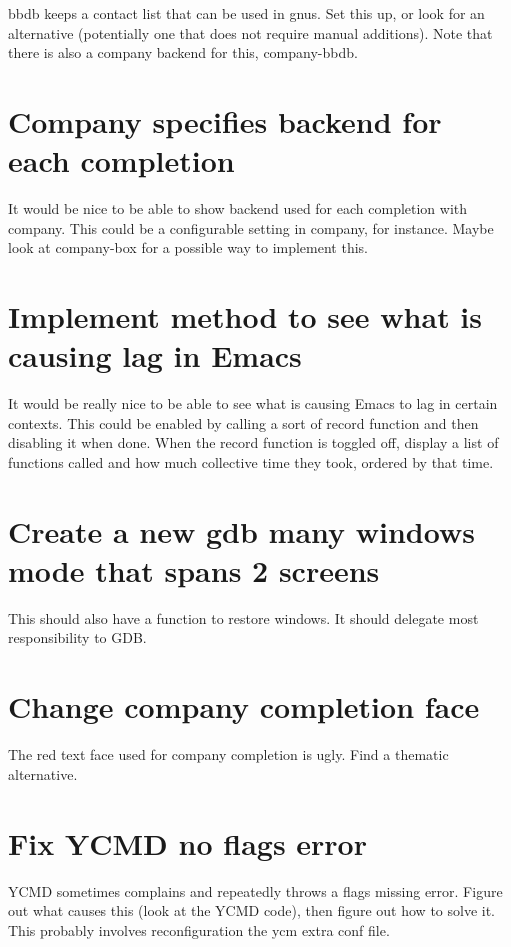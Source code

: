 \documentclass{default}
\begin{document}
bbdb keeps a contact list that can be used in gnus. Set this up, or look for an alternative
(potentially one that does not require manual additions). Note that there is also a company backend
for this, company-bbdb.

\section{Company specifies backend for each completion}

It would be nice to be able to show backend used for each completion with company. This could be a
configurable setting in company, for instance. Maybe look at company-box for a possible way to
implement this.

\section{Implement method to see what is causing lag in Emacs}

It would be really nice to be able to see what is causing Emacs to lag in certain contexts. This
could be enabled by calling a sort of record function and then disabling it when done. When the
record function is toggled off, display a list of functions called and how much collective time they
took, ordered by that time.

\section{Create a new gdb many windows mode that spans 2 screens}

This should also have a function to restore windows. It should delegate most responsibility to GDB\@.

\section{Change company completion face}

The red text face used for company completion is ugly. Find a thematic alternative.

\section{Fix YCMD no flags error}

YCMD sometimes complains and repeatedly throws a flags missing error. Figure out what causes this
(look at the YCMD code), then figure out how to solve it. This probably involves reconfiguration the
ycm extra conf file.
\end{document}
